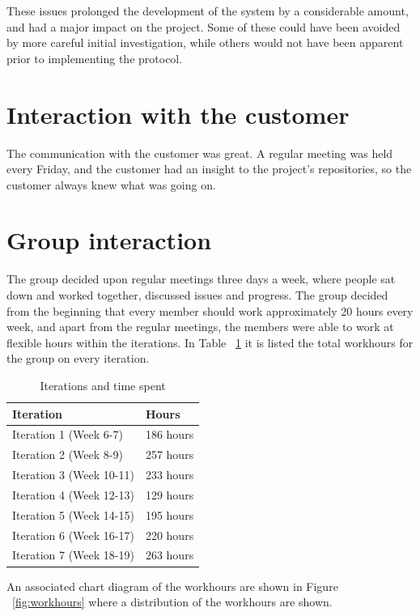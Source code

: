 These issues prolonged the development of the system by a considerable amount, and had a major impact on the project. Some
of these could have been avoided by more careful initial investigation, while others would not have been apparent prior to implementing the protocol.

\section{Interaction with the customer}
The communication with the customer was great. A regular meeting was held every Friday, and the customer had an insight to the project's repositories, so the customer always knew what was going on.


\section{Group interaction}
	The group decided upon regular meetings three days a week, where people sat down and worked together, discussed issues and progress.	The group decided from the beginning that every member should work approximately 20 hours every week, and apart from the regular meetings, the members were able to work at flexible hours within the iterations.
	In Table ~\ref{table:workhours} it is listed the total workhours for the group on every iteration.

	\begin{table}[H]
	\caption{Iterations and time spent}
	\centering
	\label{table:workhours}
	\begin{tabular}{|l|l|}
		\hline
			{\bf Iteration} & {\bf Hours}\\
		\hline
			Iteration 1 (Week 6-7) & 186 hours\\
		\hline
			Iteration 2 (Week 8-9) & 257 hours\\
		\hline
			Iteration 3 (Week 10-11) & 233 hours\\
		\hline
			Iteration 4 (Week 12-13) & 129 hours\\
		\hline
			Iteration 5 (Week 14-15) & 195 hours\\
		\hline
			Iteration 6 (Week 16-17) & 220 hours\\
		\hline
			Iteration 7 (Week 18-19) & 263 hours\\
		\hline
	\end{tabular}
	\end{table}

	An associated chart diagram of the workhours are shown in Figure ~\ref{fig:workhours} where a distribution of the workhours are shown.


